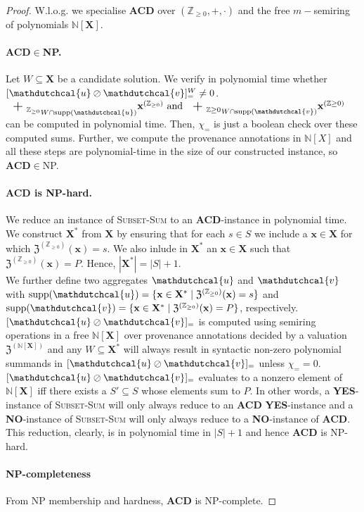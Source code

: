 \begin{proof}
W.l.o.g. we specialise \textbf{ACD} over $(\mathbb{Z}_{\geq 0},+,\cdot)$ and the free $m-$semiring of polynomials 
$\mathbb{N}[\mathbf{X}]$.
\paragraph{\textbf{ACD}$\in$NP.}
Let $W\subseteq\mathbf{X}$ be a candidate solution. We verify in polynomial time whether 
  $[\mathdutchcal{u} \oslash \mathdutchcal{v}]_=^W\neq0$.\\
${\bigplus_{\mathbb{Z}_{\geq 0}}}_{W\cap\mathrm{supp}(\mathdutchcal{u})} \mathbf{x}^{(\mathbb{Z}_{\geq 0})}\text{ and }{\bigplus_{\mathbb{Z}{\geq 0}}}_{W\cap\mathrm{supp}(\mathdutchcal{v})} \mathbf{x}^{(\mathbb{Z}{\geq 0})}$ can be computed in polynomial time.
Then, $\chi_=$ is just a boolean check over these computed sums. 
Further, we compute the provenance annotations in $\mathbb{N}[X]$ and all these steps 
are polynomial-time in the size of our constructed instance, so \textbf{ACD}$\in$NP.
\paragraph{ACD is NP-hard.}
We reduce an instance of \textsc{Subset-Sum} to an \textbf{ACD}-instance in polynomial time.\\
We construct $\mathbf{X}^*$ from $\mathbf{X}$ by ensuring that for each $s\in S$ we include a $\mathbf{x}\in\mathbf{X}$ for which 
  $\mathfrak{Z}^{(\mathbb{Z}_{\geq 0})}(\mathbf{x})=s$. We also inlude in $\mathbf{X}^*$ an $\mathbf{x}\in\mathbf{X}$ such that 
  $\mathfrak{Z}^{(\mathbb{Z}_{\geq 0})}(\mathbf{x})=P$. Hence, $|\mathbf{X}^*|=|S|+1$.\\
  We further define two aggregates $\mathdutchcal{u}$ and $\mathdutchcal{v}$ with $\mathrm{supp}(\mathdutchcal{u})=\{\mathbf{x}\in\mathbf{X}^*\mid\mathfrak{Z}^{(\mathbb{Z}_{\geq 0})}(\mathbf{x})=s\}$ and $\mathrm{supp}(\mathdutchcal{v})=\{\mathbf{x}\in\mathbf{X}^*\mid\mathfrak{Z}^{(\mathbb{Z}_{\geq 0})}(\mathbf{x})=P\}$, respectively.
  $[\mathdutchcal{u}\oslash\mathdutchcal{v}]_=$ is computed using semiring 
  operations in a free $\mathbb{N}[\mathbf{X}]$ over provenance 
  annotations decided by a valuation $\mathfrak{Z}^{(\mathbb{N}[\mathbf{X}])}$ 
  and any $W\subseteq\mathbf{X}^*$ will always result in syntactic 
  non-zero polynomial summands in  $[\mathdutchcal{u}\oslash\mathdutchcal{v}]_=$  
  unless $\chi_==0$. $[\mathdutchcal{u}\oslash\mathdutchcal{v}]_=$
evaluates to a nonzero element of $\mathbb{N}[\mathbf{X}]$
iff there exists a $S'\subseteq S$ whose elements sum to $P$.
  In other words, a \textbf{YES}-instance of \textsc{Subset-Sum} will only always reduce to an \textbf{ACD} \textbf{YES}-instance and a \textbf{NO}-instance 
  of \textsc{Subset-Sum} will only always reduce to a \textbf{NO}-instance of \textbf{ACD}. This reduction, clearly, is in polynomial time in $|S|+1$ and hence 
  \textbf{ACD} is NP-hard.
\paragraph{NP-completeness}
From NP membership and hardness, \textbf{ACD} is NP-complete.
\end{proof}

